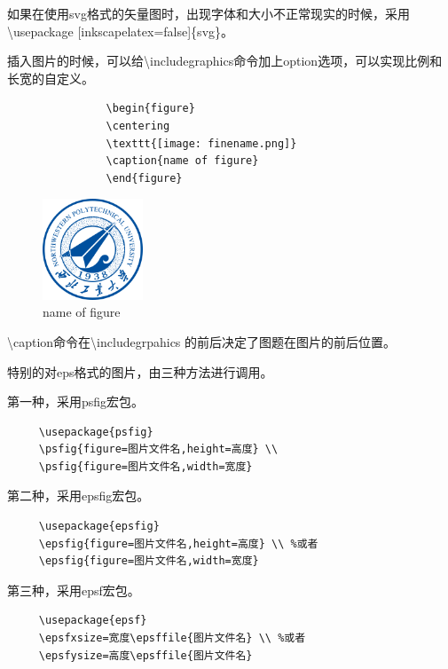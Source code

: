 \documentclass[12pt]{book}
\begin{document}
如果在使用svg格式的矢量图时，出现字体和大小不正常现实的时候，采用\textbackslash usepackage [inkscapelatex=false]\{svg\}。

插入图片的时候，可以给\textbackslash includegraphics命令加上option选项，可以实现比例和长宽的自定义。
\begin{figure}[htbp]
     \begin{minipage}{0.45\textwidth}
          \begin{verbatim}
          \begin{figure}
          \centering
          \texttt{[image: finename.png]}
          \caption{name of figure}
          \end{figure}
          \end{verbatim}
     \end{minipage}
     \begin{minipage}{0.45\textwidth}
          \centering
          \includegraphics[width=3cm]{logo.png}
          \caption{name of figure}
     \end{minipage}
\end{figure}

\textbackslash caption命令在\textbackslash includegrpahics 的前后决定了图题在图片的前后位置。

特别的对eps格式的图片，由三种方法进行调用。

第一种，采用psfig宏包。

\begin{verbatim}
     \usepackage{psfig}
     \psfig{figure=图片文件名,height=高度} \\
     \psfig{figure=图片文件名,width=宽度}
\end{verbatim}

第二种，采用epsfig宏包。

\begin{verbatim}
     \usepackage{epsfig}
     \epsfig{figure=图片文件名,height=高度} \\ %或者
     \epsfig{figure=图片文件名,width=宽度}
\end{verbatim}


第三种，采用epsf宏包。

\begin{verbatim}
     \usepackage{epsf}
     \epsfxsize=宽度\epsffile{图片文件名} \\ %或者
     \epsfysize=高度\epsffile{图片文件名}
\end{verbatim}
\end{document}
